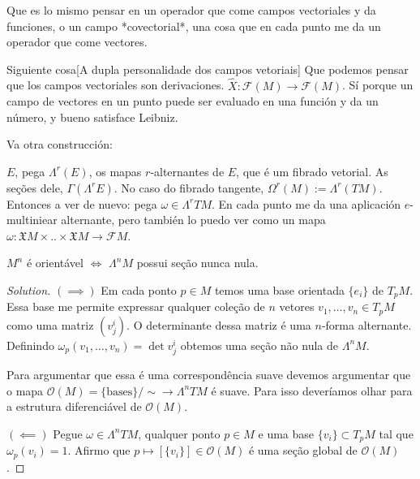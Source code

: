 \begin{upshot}\leavevmode
Que es lo mismo pensar en un operador que come campos vectoriales y da funciones, o un campo {\color{6}*covectorial*}, una cosa que en cada punto me da un operador que come vectores.
\end{upshot}

\begin{thing6}{Siguiente cosa}[A dupla personalidade dos campos vetoriais]\leavevmode
Que podemos pensar que los campos vectoriales son derivaciones. \(\hat{X}:\mathcal{F}(M) \to \mathcal{F}(M)\). Sí porque un campo de vectores en un punto puede ser evaluado en una función y da un número, y bueno satisface Leibniz.
\end{thing6}

Va otra construcción:

\(E\), pega \(\Lambda^{r}(E)\), os mapas \(r\)-alternantes de \(E\), que é um fibrado vetorial. As seções dele,  \(\Gamma(\Lambda^{r}E)\). No caso do fibrado tangente, \(\Omega^r(M):= \Lambda^{r}(TM)\). Entonces a ver de nuevo: pega \(\omega \in \Lambda^{r}TM\). En cada punto me da una aplicación \(e\)-multiniear alternante, pero también lo puedo ver como un mapa \(\omega: \mathfrak{X} M\times .. \times \mathfrak{X}M \to \mathcal{F}M\).

\begin{exercise}\leavevmode
\(M^n\) é orientável \(\iff\) \(\Lambda^{n}M\) possui seção nunca nula.
\end{exercise}

\begin{proof}[Solution]\leavevmode
\((\implies )\) Em cada ponto \(p \in M\) temos uma base orientada \(\{e_i\}\) de \(T_pM\). Essa base me permite expressar qualquer coleção de \(n\) vetores \(v_1,\ldots,v_n \in T_pM\) como uma matriz \((v^i_{j})\). O determinante dessa matriz é uma \(n\)-forma alternante. Definindo  \(\omega_p(v_1,\ldots,v_n)=\det v^i_j\) obtemos uma seção não nula de \(\Lambda^{n}M\).

Para argumentar que essa é uma correspondência suave devemos argumentar que o mapa \(\mathcal{O}(M)=\{\text{bases} \}/\sim \longrightarrow \Lambda^{n}TM\) é suave. Para isso deveríamos olhar para a estrutura diferenciável de \(\mathcal{O}(M)\).

\((\impliedby)\) Pegue \(\omega \in \Lambda^{n}TM\), qualquer ponto \(p \in M\) e uma base \(\{v_i\}\subset T_pM\) tal que \(\omega_p(v_i)=1\). Afirmo que \(p \mapsto [\{v_i\}]\in \mathcal{O}(M)\) é uma seção global de \(\mathcal{O}(M)\).
\end{proof}

